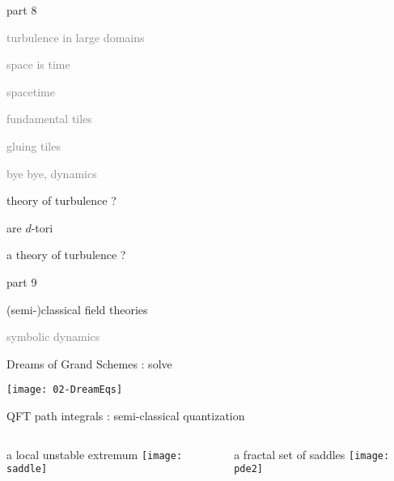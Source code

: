 \begin{frame}{part 8}
\begin{enumerate}
              \item
    \textcolor{gray}{\small
turbulence in large domains
              \item
space is time
              \item
spacetime
              \item
fundamental tiles
              \item
gluing tiles
              \item
bye bye, dynamics
    }
              \item {\Large
theory of turbulence ?
                    }
            \end{enumerate}
\end{frame}



\begin{frame}{are $d$-tori}

\vfill

{\Huge
a theory of turbulence ?
                  }

\vfill

\end{frame}

\begin{frame}{part 9}
\begin{enumerate}
              \item
    {\Large
(semi-)classical field theories
    }\textcolor{gray}{\small
              \item
\statesp
              \item
 symbolic dynamics
                    }
            \end{enumerate}
\end{frame}

\begin{frame}{Dreams of Grand Schemes : solve}
 \begin{center}
   \texttt{[image: 02-DreamEqs]}
 \end{center}
\end{frame}

\begin{frame}{QFT path integrals : semi-classical quantization}
  \begin{columns}
\begin{block}{a local unstable extremum}
\texttt{[image: saddle]}%
\end{block}
\begin{block}{a fractal set of saddles}
\texttt{[image: pde2]}%
\end{block}
  \end{columns}
\end{frame}

